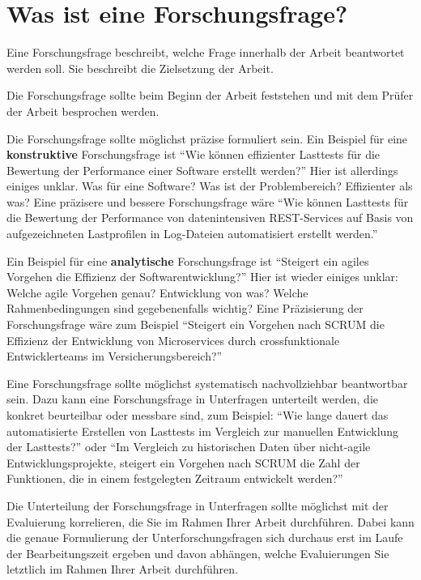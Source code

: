 \section{Was ist eine Forschungsfrage?}

Eine Forschungsfrage beschreibt, welche Frage innerhalb der Arbeit beantwortet werden soll. Sie beschreibt die Zielsetzung der Arbeit. 

Die Forschungsfrage sollte beim Beginn der Arbeit feststehen und mit dem Prüfer der Arbeit besprochen werden.

Die Forschungsfrage sollte möglichst präzise formuliert sein. Ein Beispiel für eine \textbf{konstruktive} Forschungsfrage ist \enquote{Wie können effizienter Lasttests für die Bewertung der Performance einer Software erstellt werden?} Hier ist allerdings einiges unklar. Was für eine Software? Was ist der Problembereich? Effizienter als was? Eine präzisere und bessere Forschungsfrage wäre \enquote{Wie können Lasttests für die Bewertung der Performance von datenintensiven REST-Services auf Basis von aufgezeichneten Lastprofilen in Log-Dateien automatisiert erstellt werden.}

Ein Beispiel für eine \textbf{analytische} Forschungsfrage ist \enquote{Steigert ein agiles Vorgehen die Effizienz der Softwarentwicklung?} Hier ist wieder einiges unklar: Welche agile Vorgehen genau? Entwicklung von was? Welche Rahmenbedingungen sind gegebenenfalls wichtig? Eine Präzisierung der Forschungsfrage wäre zum Beispiel \enquote{Steigert ein Vorgehen nach SCRUM die Effizienz der Entwicklung von Microservices durch crossfunktionale Entwicklerteams im Versicherungsbereich?}

Eine Forschungsfrage sollte möglichst systematisch nachvollziehbar beantwortbar sein. Dazu kann eine Forschungsfrage in Unterfragen unterteilt werden, die konkret beurteilbar oder messbare sind, zum Beispiel: \enquote{Wie lange dauert das automatisierte Erstellen von Lasttests im Vergleich zur manuellen Entwicklung der Lasttests?} oder \enquote{Im Vergleich zu historischen Daten über nicht-agile Entwicklungsprojekte, steigert ein Vorgehen nach SCRUM die Zahl der Funktionen, die in einem festgelegten Zeitraum entwickelt werden?}

Die Unterteilung der Forschungsfrage in Unterfragen sollte möglichst mit der Evaluierung korrelieren, die Sie im Rahmen Ihrer Arbeit durchführen. Dabei kann die genaue Formulierung der Unterforschungsfragen sich durchaus erst im Laufe der Bearbeitungszeit ergeben und davon abhängen, welche Evaluierungen Sie letztlich im Rahmen Ihrer Arbeit durchführen.

